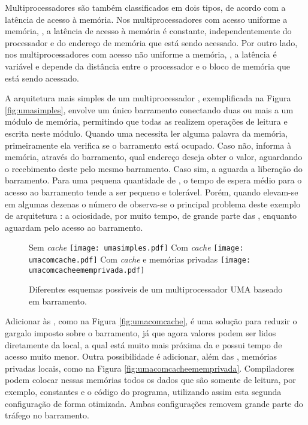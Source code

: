 Multiprocessadores são também classificados em dois tipos, de acordo com a latência de acesso à memória. Nos multiprocessadores com acesso uniforme a memória, \textit{\UMA}, a latência de acesso à memória é constante, independentemente do processador e do endereço de memória que está sendo acessado. Por outro lado, nos multiprocessadores com acesso não uniforme a memória, \textit{\NUMA}, a latência é variável e depende da distância entre o processador e o bloco de memória que está sendo acessado.

A arquitetura mais simples de um multiprocessador \UMA, exemplificada na Figura \ref{fig:umasimples}, envolve um único barramento conectando duas ou mais \CPUs a um módulo de memória, permitindo que todas as \CPUs realizem operações de leitura e escrita neste módulo. Quando uma \CPU necessita ler alguma palavra da memória, primeiramente ela verifica se o barramento está ocupado. Caso não, informa à memória, através do barramento, qual endereço deseja obter o valor, aguardando o recebimento deste pelo mesmo barramento. Caso sim, a \CPU aguarda a liberação do barramento. Para uma pequena quantidade de \CPUs, o tempo de espera médio para o acesso ao barramento tende a ser pequeno e tolerável. Porém, quando elevam-se em algumas dezenas o número de \CPUs observa-se o principal problema deste exemplo de arquitetura \UMA: a ociosidade, por muito tempo, de grande parte das \CPUs, enquanto aguardam pelo acesso ao barramento.

\begin{figure}[tb]
  \centering
  \caption{Diferentes esquemas possiveis de um multiprocessador UMA baseado em barramento.}
    {Sem \textit{cache}}%
    {\texttt{[image: umasimples.pdf]}}%
  \hfill%
    {Com \textit{cache}}%
    {\texttt{[image: umacomcache.pdf]}}%
  \hfill%
    {Com \textit{cache} e memórias privadas}%
    {\texttt{[image: umacomcacheememprivada.pdf]}}%
  \hfill%
\end{figure}

Adicionar \caches às \CPUs, como na Figura \ref{fig:umacomcache}, é uma solução para reduzir o gargalo imposto sobre o barramento, já que agora valores podem ser lidos diretamente da \cache local, a qual está muito mais próxima da \CPU e possui tempo de acesso muito menor. Outra possibilidade é adicionar, além das \caches, memórias privadas locais,  como na Figura \ref{fig:umacomcacheememprivada}. Compiladores podem colocar nessas memórias todos os dados que são somente de leitura, por exemplo, constantes e o código do programa, utilizando assim esta segunda configuração de forma otimizada. Ambas configurações removem grande parte do tráfego no barramento.

